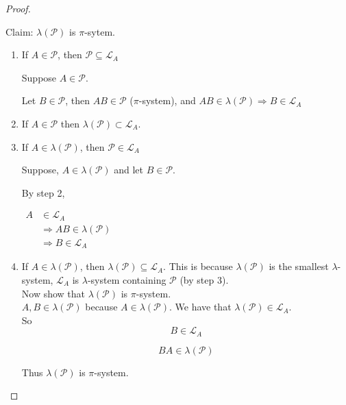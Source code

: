 \documentclass[11pt,fleqn]{book} %
\begin{document}
\begin{proof}
\begin{enumerate}
\begin{enumerate}
		\end{enumerate}

	Claim: $\lambda(\mathscr{P})$ is $\pi$-sytem.

	\begin{enumerate}
		\item If $A \in \mathscr{P}$, then $\mathscr{P} \subseteq \mathscr{L}_A$

	Suppose $A \in \mathscr{P}$.

	Let $B \in \mathscr{P}$, then $AB \in \mathscr{P}$ ($\pi$-system), and $AB \in \lambda(\mathscr{P}) \Rightarrow B \in \mathscr{L}_A$

		\item If $A \in \mathscr{P}$ then $\lambda(\mathscr{P}) \subset \mathscr{L}_A$.

		\item If $A \in \lambda(\mathscr{P})$, then $\mathscr{P} \in \mathscr{L}_A$

		Suppose, $A \in \lambda(\mathscr{P})$ and let $B \in \mathscr{P}$. 

		By step 2,


			$\begin{aligned}
				A &\in \mathscr{L}_A\\
					&\Rightarrow AB \in \lambda(\mathscr{P})\\
					&\Rightarrow B \in \mathscr{L}_A	
			\end{aligned}$

		\item If $A \in \lambda(\mathscr{P})$, then $\lambda(\mathscr{P}) \subseteq \mathscr{L}_A$. This is because $\lambda(\mathscr{P})$ is the smallest $\lambda$-system, $\mathscr{L}_A$ is $\lambda$-system containing $\mathscr{P}$ (by step 3).\\

		Now show that $\lambda(\mathscr{P})$ is $\pi$-system.\\

		$A, B \in \lambda(\mathscr{P})$ because $A \in \lambda(\mathscr{P})$. We have that $\lambda(\mathscr{P}) \in \mathscr{L}_A$.\\

		So 
		$$B \in \mathscr{L}_A $$ 

		$$BA \in \lambda(\mathscr{P})$$

		Thus $\lambda(\mathscr{P})$ is $\pi$-system.
	\end{enumerate}
	\end{enumerate}
\end{proof}
\end{document}
